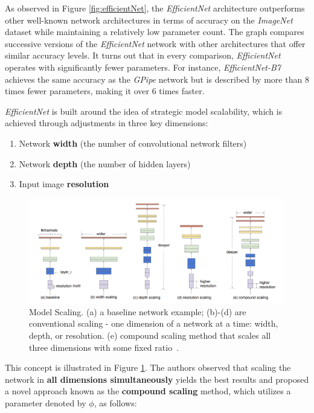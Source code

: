 As observed in Figure \ref{fig:efficientNet}, the \textit{EfficientNet} architecture outperforms other well-known network architectures in terms of accuracy on the \textit{ImageNet} dataset while maintaining a relatively low parameter count. The graph compares successive versions of the \textit{EfficientNet} network with other architectures that offer similar accuracy levels. It turns out that in every comparison, \textit{EfficientNet} operates with significantly fewer parameters. For instance, \textit{EfficientNet-B7} achieves the same accuracy as the \textit{GPipe} network but is described by more than 8 times fewer parameters, making it over 6 times faster.

\textit{EfficientNet} is built around the idea of strategic model scalability, which is achieved through adjustments in three key dimensions:
\begin{enumerate}
    \item Network \textbf{width} (the number of convolutional network filters)
    \item Network \textbf{depth} (the number of hidden layers)
    \item Input image \textbf{resolution}
\end{enumerate}

\begin{figure}[!htb]
    \centering
    \includegraphics[scale=0.7]{Images/efficient-net-model-scaling.png}
    \caption{Model Scaling. (a) a baseline network example; (b)-(d) are conventional scaling - one dimension of a network at a time: width, depth, or resolution. (e) compound scaling method that scales all three dimensions with some fixed ratio~\cite{EfficientNet}.}
    \label{fig:modelScaling}
\end{figure}

This concept is illustrated in Figure \ref{fig:modelScaling}. The authors observed that scaling the network in \textbf{all dimensions simultaneously} yields the best results and proposed a novel approach known as the \textbf{compound scaling} method, which utilizes a parameter denoted by $\phi$, as follows:

